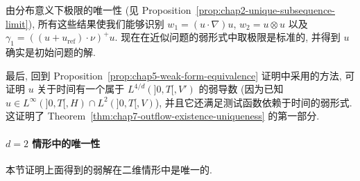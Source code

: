 \begin{sloppypar}
\begin{Proof}
由分布意义下极限的唯一性 (见 Proposition~\ref{prop:chap2-unique-subsequence-limit}), 所有这些结果使我们能够识别
$w_1=(u\cdot\nabla)u$, $w_2=u\otimes u$ 以及
$\gamma_1=((u+u_{\mathrm{ref}})\cdot\nu)^+u$. 现在在近似问题的弱形式中取极限是标准的, 并得到 $u$ 确实是初始问题的解.

最后, 回到 Proposition~\ref{prop:chap5-weak-form-equivalence} 证明中采用的方法, 可证明 $u$ 关于时间有一个属于 $L^{4/d}(]0,T[,V')$ 的弱导数 (因为已知 $u\in L^\infty(]0,T[,H)\cap L^2(]0,T[,V)$), 并且它还满足测试函数依赖于时间的弱形式. 这证明了 Theorem~\ref{thm:chap7-outflow-existence-uniqueness} 的第一部分.
\end{Proof}

\paragraph{$d=2$ 情形中的唯一性}
\label{subsec:chap7-outflow-uniqueness-two-dimensional}

本节证明上面得到的弱解在二维情形中是唯一的.


\end{sloppypar}
